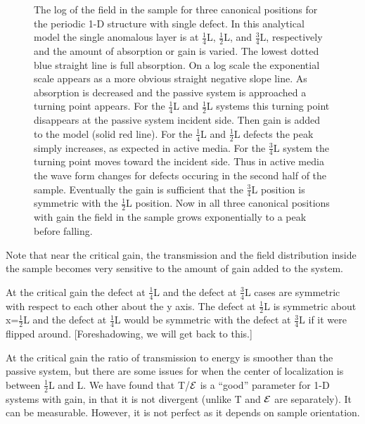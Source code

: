 \begin{figure}
\vskip -0.5cm
\centerline{
}
\vskip -0.5cm
\caption{The log of the field in the sample for three canonical positions for the periodic 1-D structure with single defect. In this analytical model the single anomalous layer is at $ \frac{1}{4} $L, $ \frac{1}{2} $L, and $ \frac{3}{4} $L, respectively and the amount of absorption or gain is varied. The lowest dotted blue straight line is full absorption. On a log scale the exponential scale appears as a more obvious straight negative slope line. As absorption is decreased and the passive system is approached a turning point appears. For the $ \frac{1}{4} $L and $ \frac{1}{2} $L systems this turning point disappears at the passive system incident side. Then gain is added to the model (solid red line). For the $ \frac{1}{4} $L and $ \frac{1}{2} $L defects the peak simply increases, as expected in active media. For the $ \frac{3}{4} $L system the turning point moves toward the incident side. Thus in active media the wave form changes for defects occuring in the second half of the sample. Eventually the gain is sufficient that the $ \frac{3}{4} $L position is symmetric with the  $ \frac{1}{2} $L position. Now in all three canonical positions with gain the field in the sample grows exponentially to a peak before falling.}
\label{fig:periodicdefect}
\end{figure}

Note that near the critical gain, the transmission and the field distribution inside the sample becomes very sensitive to the amount of gain added to the system. %

At the critical gain the defect at $ \frac{1}{4} $L and the
defect at $ \frac{3}{4} $L
cases are symmetric with respect to each other about the y axis.
The defect at $ \frac{1}{2} $L is symmetric about x=$ \frac{1}{2} $L
and the defect at $ \frac{1}{4} $L would be symmetric
with the defect at $ \frac{3}{4} $L if
it were flipped around. [Foreshadowing, we will get back to this.]

At the critical gain the ratio of transmission to energy
is smoother than the passive system,
but there are some issues for when the center of
localization is between $ \frac{1}{2}$L and L. We have
found that T/${\cal E}$ is
a ``good'' parameter for 1-D systems with gain, in that it is
not divergent (unlike T and ${\cal E}$ are separately).  It can be
measurable.  However, it is not perfect as it depends on sample orientation.

